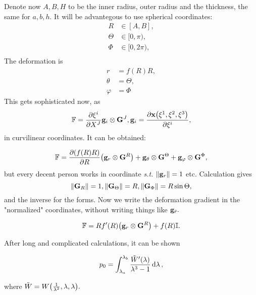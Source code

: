 \documentclass[11pt]{scrartcl} %
\begin{document}
Denote now $A,B,H$ to be the inner radius, outer radius and the thickness, the same for $a,b,h.$ It will be advantegous to use spherical coordinates:
\begin{align*}
	R &\in [A,B],\\
	\Theta &\in [0, \pi), \\
	\Phi &\in [0, 2 \pi), \\
\end{align*}
The deformation is 
\begin{align*}
	r &= f(R) R, \\
	\theta &= \Theta, \\
	\varphi &= \Phi
\end{align*}
This gets sophisticated now, as
\[
	\mathbb{F} = \pdv{\xi^i}{X^J}\vb{g}_i \otimes \vb{G}^J, \vb{g}_i = \pdv{\vb{x}\qty(\xi^1, \xi^2, \xi^3)}{\xi^i},
\]
in curvilinear coordinates. It can be obtained:

\[
	\mathbb{F} = \pdv{\qty(f(R)R)}{R} \qty(\vb{g}_r \otimes \vb{G}^R) + \vb{g}_{\theta}\otimes \vb{G}^{\Theta} + \vb{g}_{\varphi}\otimes \vb{G}^{\Phi},
\]
but every decent person works in coordinate \textit{s.t.} $\norm{\vb{g}_r} = 1$ etc. Calculation gives
\[
	\norm{\vb{G}_R} = 1, \norm{\vb{G}_{\Theta}} = R, \norm{\vb{G}_{\Phi}} = R \sin \Theta,
\]
and the inverse for the forms. Now we write the deformation gradient in the "normalized" coordinates, without writing things like $\vb{g}_{\hat{r}}.$

\[
	\mathbb{F} = R f'(R)\qty(\vb{g}_r \otimes \vb{G}^R)+ f(R)\mathbb{I}.
\]

After long and complicated calculations, it can be shown

\[
	p_0 = \int_{\lambda_a}^{\lambda_b} \frac{\tilde{W}'\qty(\lambda)}{\lambda^{3}-1} \dd{\lambda},
\]

where $\tilde{W} = W\qty(\frac{1}{\lambda^{2}}, \lambda, \lambda).$

\newpage
\printbibliography
\end{document}
